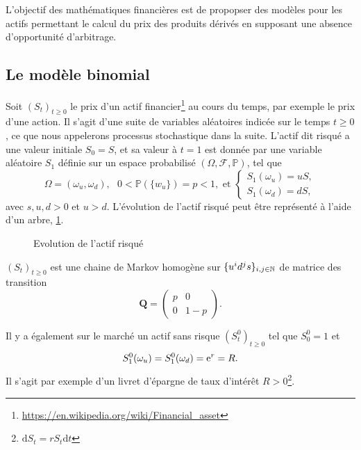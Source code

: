 L'objectif des mathématiques financières est de propopser des modèles pour les actifs permettant le calcul du prix des produits  dérivés en supposant une absence d'opportunité d'arbitrage. 

\subsection{Le modèle binomial}\label{sec:binomial_modele}
Soit $(S_t)_{t\geq 0}$ le prix d'un actif financier\footnote{\url{https://en.wikipedia.org/wiki/Financial_asset}} au cours du temps, par exemple le prix d'une action. 
Il s'agit d'une suite de variables aléatoires indicée sur le temps $t\geq 0$, ce que nous appelerons processus stochastique dans la suite. L'actif dit risqué a une valeur initiale $S_0 = S$, et sa valeur à $t= 1$ est donnée par une variable aléatoire $S_1$ définie sur un espace probabilisé $(\Omega, \mathcal{F}, \mathbb{P})$, tel que 
$$
\Omega = (\omega_u,\omega_d),\text{ }0<\mathbb{P}(\{w_u\}) = p<1,\text{ et }\begin{cases}
S_1(\omega_u) = uS,\\
S_1(\omega_d) = dS,
\end{cases}
$$
avec $s,u,d>0$ et $u>d$. L'évolution de l'actif risqué peut être représenté à l'aide d'un arbre, \cf \cref{fig:actif_risk}.
\begin{figure}[h!]
\begin{center}
\caption{Evolution de l'actif risqué}
\label{fig:actif_risk}
\end{center}
\end{figure}
\begin{remark}
$(S_t)_{t\geq0}$ est une chaine de Markov homogène sur $\{u^id^js\}_{i,j\in\mathbb{N}}$ de matrice des transition 
$$
\mathbf{Q} =\left(\begin{array}{cc}p&0\\
0&1-p\end{array}\right) .
$$
\end{remark}
Il y a également sur le marché un actif sans risque $(S^0_t)_{t\geq0}$ tel que $S^0_0 = 1$ et 
$$
S^0_1(\omega_u) = S^0_1(\omega_d) = \mathrm{e}^r = R.
$$
Il s'agit par exemple d'un livret d'épargne de taux d'intérêt $R>0$\footnote{$\text{d}S_t = r S_t\text{d}t$}.\\

